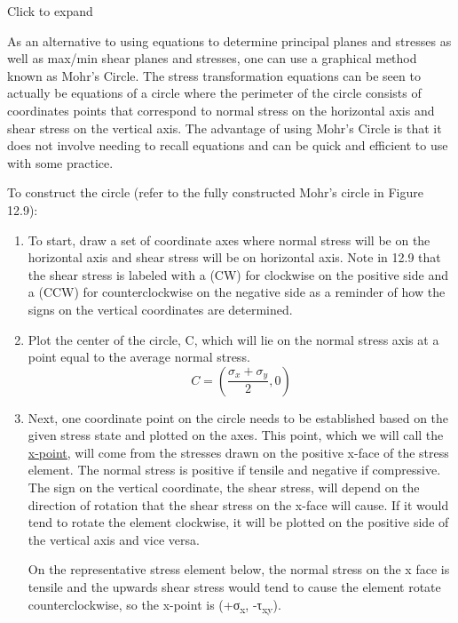 \documentclass[
  letterpaper,
  DIV=11,
  numbers=noendperiod]{scrreprt}
\theoremstyle{definition}
\theoremstyle{remark}
\begin{document}
Click to expand

As an alternative to using equations to determine principal planes and
stresses as well as max/min shear planes and stresses, one can use a
graphical method known as Mohr's Circle. The stress transformation
equations can be seen to actually be equations of a circle where the
perimeter of the circle consists of coordinates points that correspond
to normal stress on the horizontal axis and shear stress on the vertical
axis. The advantage of using Mohr's Circle is that it does not involve
needing to recall equations and can be quick and efficient to use with
some practice.

To construct the circle (refer to the fully constructed Mohr's circle in
Figure 12.9):

\begin{enumerate}
\def\labelenumi{\arabic{enumi}.}
\item
  To start, draw a set of coordinate axes where normal stress will be on
  the horizontal axis and shear stress will be on horizontal axis. Note
  in 12.9 that the shear stress is labeled with a (CW) for clockwise on
  the positive side and a (CCW) for counterclockwise on the negative
  side as a reminder of how the signs on the vertical coordinates are
  determined.
\item
  Plot the center of the circle, C, which will lie on the normal stress
  axis at a point equal to the average normal stress.\\
  \[
  C=\left(\frac{\sigma_x+\sigma_y}{2}, 0\right)
  \]
\item
  Next, one coordinate point on the circle needs to be established based
  on the given stress state and plotted on the axes. This point, which
  we will call the \ul{x-point,} will come from the stresses drawn on
  the positive x-face of the stress element. The normal stress is
  positive if tensile and negative if compressive. The sign on the
  vertical coordinate, the shear stress, will depend on the direction of
  rotation that the shear stress on the x-face will cause. If it would
  tend to rotate the element clockwise, it will be plotted on the
  positive side of the vertical axis and vice versa.

  On the representative stress element below, the normal stress on the x
  face is tensile and the upwards shear stress would tend to cause the
  element rotate counterclockwise, so the x-point is
  (+σ\textsubscript{x}, -τ\textsubscript{xy}).


\end{enumerate}
\end{document}
